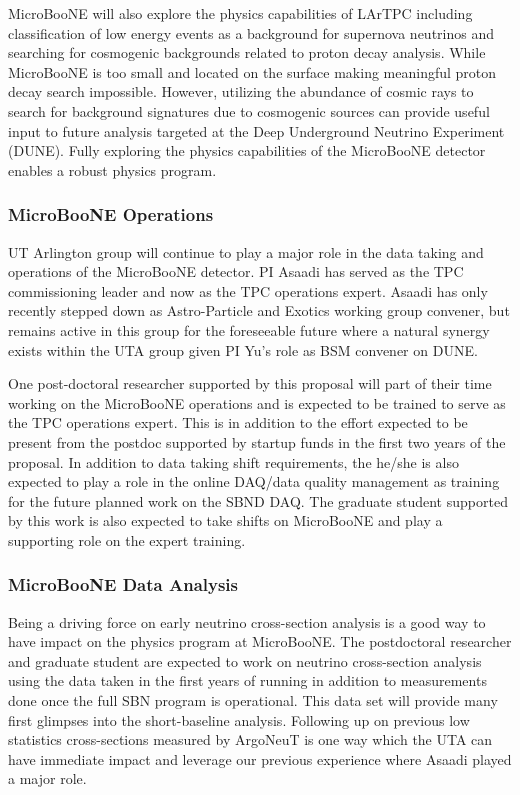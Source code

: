 MicroBooNE will also explore the physics capabilities of LArTPC including classification of low energy events as a background for supernova neutrinos and searching for cosmogenic backgrounds related to proton decay analysis. While MicroBooNE is too small and located on the surface making meaningful proton decay search impossible. However, utilizing the abundance of cosmic rays to search for background signatures due to cosmogenic sources can provide useful input to future analysis targeted at the Deep Underground Neutrino Experiment (DUNE). Fully exploring the physics capabilities of the MicroBooNE detector enables a robust physics program. 

\subsubsection{MicroBooNE Operations}\label{sec:UbooneOperations}
UT Arlington group will continue to play a major role in the data taking and operations of the MicroBooNE detector. PI Asaadi has served as the TPC commissioning leader and now as the TPC operations expert. Asaadi has only recently stepped down as Astro-Particle and Exotics working group convener, but remains active in this group for the foreseeable future where a natural synergy exists within the UTA group given PI Yu's role as BSM convener on DUNE.

One post-doctoral researcher supported by this proposal will part of their time working on the MicroBooNE operations and is expected to be trained to serve as the TPC operations expert. This is in addition to the effort expected to be present from the postdoc supported by startup funds in the first two years of the proposal. In addition to data taking shift requirements, the he/she is also expected to play a role in the online DAQ/data quality management as training for the future planned work on the SBND DAQ. The graduate student supported by this work is also expected to take shifts on MicroBooNE and play a supporting role on the expert training.


\subsubsection{MicroBooNE Data Analysis}\label{sec:UbooneDataAnalysis}
Being a driving force on early neutrino cross-section analysis is a good way to have impact on the physics program at MicroBooNE. The postdoctoral researcher and graduate student are expected to work on neutrino cross-section analysis using the data taken in the first years of running in addition to measurements done once the full SBN program is operational. This data set will provide many first glimpses into the short-baseline analysis. Following up on previous low statistics cross-sections measured by ArgoNeuT is one way which the UTA can have immediate impact and leverage our previous experience where Asaadi played a major role. 

